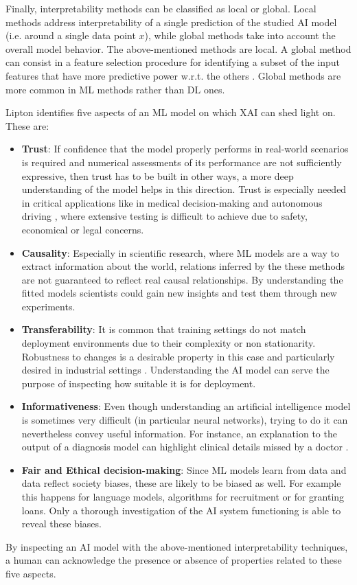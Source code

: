 Finally, interpretability methods can be classified as local or global.
Local methods address interpretability of a single prediction of the studied AI model (i.e. around a single data point $x$), while global methods take into account the overall model behavior.
The above-mentioned methods are local.
A global method can consist in a feature selection procedure for identifying a subset of the input features that have more predictive power w.r.t. the others \cite{molnar2022}.
Global methods are more common in ML methods rather than DL ones. 

Lipton \cite{Lipton} identifies five aspects of an ML model on which XAI can shed light on.
These are:
\begin{itemize}
\item{\textbf{Trust}: If confidence that the model properly performs in real-world scenarios is 
required and numerical assessments of its performance are not sufficiently 
expressive, then trust has to be built in other ways, a more deep understanding of 
the model helps in this direction. Trust is especially needed in critical applications 
like in medical decision-making \cite{XAI_healthcare} and autonomous driving \cite{Zablocki2022}, where extensive 
testing is difficult to achieve due to safety, economical or legal concerns.}
\item{\textbf{Causality}:
Especially in scientific research, where ML models are a way to extract information about the world, relations inferred by the these methods are not guaranteed to reflect real causal relationships.
By understanding the fitted models scientists could gain new insights and test them through new experiments.
}
\item{\textbf{Transferability}:
It is common that training settings do not match deployment environments due to their complexity or non stationarity.
Robustness to changes is a desirable property in this case and particularly desired in industrial settings \cite{XAI_industry}. 
Understanding the AI model can serve the purpose of inspecting how suitable it is for deployment.
}
\item{\textbf{Informativeness}:
Even though understanding an artificial intelligence model is sometimes very difficult (in particular neural networks), trying to do it can nevertheless convey useful information.
For instance, an explanation to the output of a diagnosis model can highlight clinical details missed by a doctor \cite{XAI_healthcare}.
}
\item{\textbf{Fair and Ethical decision-making}:
Since ML models learn from data and data reflect society biases, these are likely to be biased as well.
For example this happens for language models, algorithms for recruitment or for granting loans. 
Only a thorough investigation of the AI system functioning is able to reveal these biases.
}
\end{itemize}
By inspecting an AI model with the above-mentioned interpretability techniques, a human can acknowledge the presence or absence of properties related to these five aspects.

